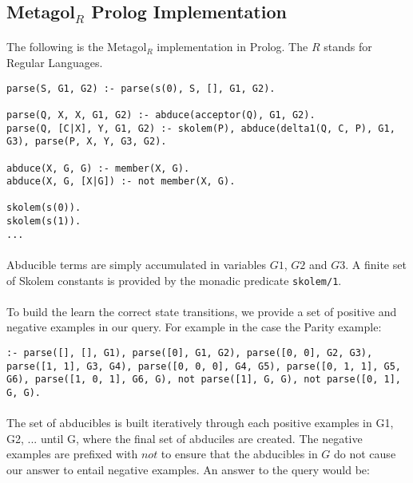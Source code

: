 \documentclass{article}
\theoremstyle{plain}
\theoremstyle{definition}
\begin{document}
\begin{multicols}{2}

\subsection{Metagol${}_R$ Prolog Implementation}

\paragraph{} The following is the Metagol${}_R$ implementation in Prolog. The $R$ stands for Regular Languages.

\begin{lstlisting}
parse(S, G1, G2) :- parse(s(0), S, [], G1, G2).

parse(Q, X, X, G1, G2) :- abduce(acceptor(Q), G1, G2).
parse(Q, [C|X], Y, G1, G2) :- skolem(P), abduce(delta1(Q, C, P), G1, G3), parse(P, X, Y, G3, G2).

abduce(X, G, G) :- member(X, G).
abduce(X, G, [X|G]) :- not member(X, G).

skolem(s(0)).
skolem(s(1)).
...
\end{lstlisting}

\paragraph{} Abducible terms are simply accumulated in variables $G1$, $G2$ and $G3$. A finite set of Skolem constants is provided by the monadic predicate \lstinline{skolem/1}.

\paragraph{} To build the learn the correct state transitions, we provide a set of positive and negative examples in our query. For example in the case the Parity example:

\begin{lstlisting}
:- parse([], [], G1), parse([0], G1, G2), parse([0, 0], G2, G3), parse([1, 1], G3, G4), parse([0, 0, 0], G4, G5), parse([0, 1, 1], G5, G6), parse([1, 0, 1], G6, G), not parse([1], G, G), not parse([0, 1], G, G).
\end{lstlisting}

\paragraph{} The set of abducibles is built iteratively through each positive examples in G1, G2, ... until G, where the final set of abduciles are created. The negative examples are prefixed with $not$ to ensure that the abducibles in $G$ do not cause our answer to entail negative examples. An answer to the query would be:


\end{multicols}
\end{document}
